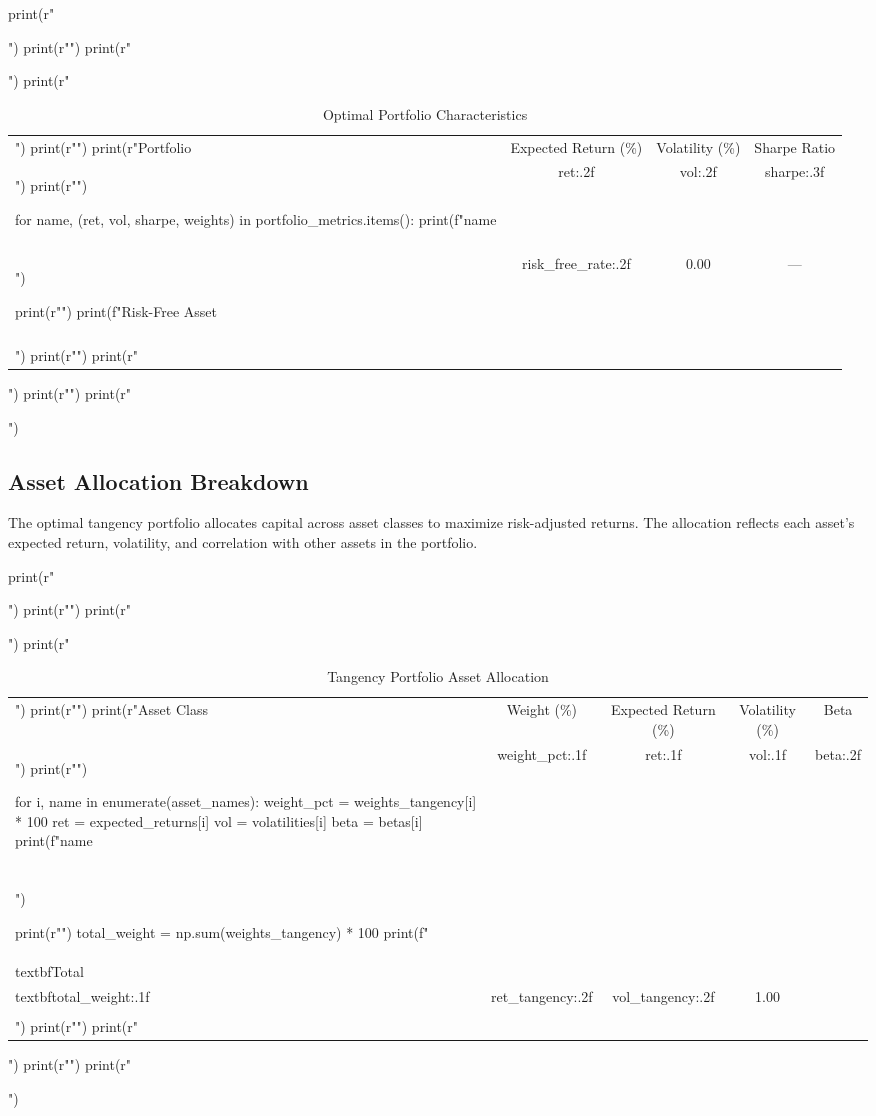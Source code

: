 \documentclass[a4paper, 11pt]{article}
\begin{document}
\begin{pycode}
print(r"\begin{table}[htbp]")
print(r"\centering")
print(r"\caption{Optimal Portfolio Characteristics}")
print(r"\begin{tabular}{lccc}")
print(r"\toprule")
print(r"Portfolio & Expected Return (\%) & Volatility (\%) & Sharpe Ratio \\")
print(r"\midrule")

for name, (ret, vol, sharpe, weights) in portfolio_metrics.items():
    print(f"{name} & {ret:.2f} & {vol:.2f} & {sharpe:.3f} \\\\")

print(r"\midrule")
print(f"Risk-Free Asset & {risk_free_rate:.2f} & 0.00 & --- \\\\")
print(r"\bottomrule")
print(r"\end{tabular}")
print(r"\label{tab:portfolios}")
print(r"\end{table}")
\end{pycode}

\subsection{Asset Allocation Breakdown}

The optimal tangency portfolio allocates capital across asset classes to maximize risk-adjusted
returns. The allocation reflects each asset's expected return, volatility, and correlation with
other assets in the portfolio.

\begin{pycode}
print(r"\begin{table}[htbp]")
print(r"\centering")
print(r"\caption{Tangency Portfolio Asset Allocation}")
print(r"\begin{tabular}{lcccc}")
print(r"\toprule")
print(r"Asset Class & Weight (\%) & Expected Return (\%) & Volatility (\%) & Beta \\")
print(r"\midrule")

for i, name in enumerate(asset_names):
    weight_pct = weights_tangency[i] * 100
    ret = expected_returns[i]
    vol = volatilities[i]
    beta = betas[i]
    print(f"{name} & {weight_pct:.1f} & {ret:.1f} & {vol:.1f} & {beta:.2f} \\\\")

print(r"\midrule")
total_weight = np.sum(weights_tangency) * 100
print(f"\\textbf{{Total}} & \\textbf{{{total_weight:.1f}}} & {ret_tangency:.2f} & {vol_tangency:.2f} & 1.00 \\\\")
print(r"\bottomrule")
print(r"\end{tabular}")
print(r"\label{tab:allocation}")
print(r"\end{table}")
\end{pycode}
\end{document}
